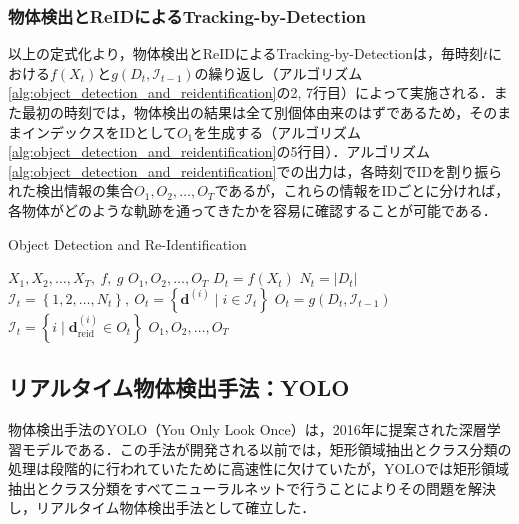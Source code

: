         \subsubsection{物体検出とReIDによるTracking-by-Detection}
        以上の定式化より，物体検出とReIDによるTracking-by-Detectionは，毎時刻$t$における$f(X_t)$と$g(D_t, \mathcal{I}_{t-1})$の繰り返し（アルゴリズム\ref{alg:object_detection_and_reidentification}の2, 7行目）によって実施される．また最初の時刻では，物体検出の結果は全て別個体由来のはずであるため，そのままインデックスをIDとして$O_1$を生成する（アルゴリズム\ref{alg:object_detection_and_reidentification}の5行目）．アルゴリズム\ref{alg:object_detection_and_reidentification}での出力は，各時刻でIDを割り振られた検出情報の集合$O_1, O_2, \dots, O_T$であるが，これらの情報をIDごとに分ければ，各物体がどのような軌跡を通ってきたかを容易に確認することが可能である．

        \begin{algorithm}[t]
            \caption{Object Detection and Re-Identification}
            \label{alg:object_detection_and_reidentification}
            \begin{algorithmic}[1]
                \Require $X_1, X_2, \dots, X_T, ~f, ~g$
                \Ensure $O_1, O_2, \dots, O_T$
                    \State $D_t = f(X_t)$
                    \State $ N_t = \left|D_t\right|$
                        \State $\mathcal{I}_t = \left\{1, 2, \dots, N_t\right\}, ~ O_t = \left\{\bm{d}^{(i)} \mid i \in \mathcal{I}_t\right\}$
                    \Else
                        \State $O_t = g(D_t, \mathcal{I}_{t-1})$
                        \State $\mathcal{I}_t = \left\{i \mid \bm{d}_{\text{reid}}^{(i)} \in O_t\right\}$
                    \EndIf
                \EndFor
                \State \Return $O_1, O_2, \dots, O_T$
            \end{algorithmic}
        \end{algorithm}

    \subsection{リアルタイム物体検出手法：YOLO}
    \label{subsec:object_detection}

    物体検出手法のYOLO（You Only Look Once）\cite{redmon2016you, alif2024yolov1}は，2016年に提案された深層学習モデルである．この手法が開発される以前では，矩形領域抽出とクラス分類の処理は段階的に行われていた\cite{girshick2014rich,girshick2015fast,ren2016faster}ために高速性に欠けていたが，YOLOでは矩形領域抽出とクラス分類をすべてニューラルネットで行うことによりその問題を解決し，リアルタイム物体検出手法として確立した．

